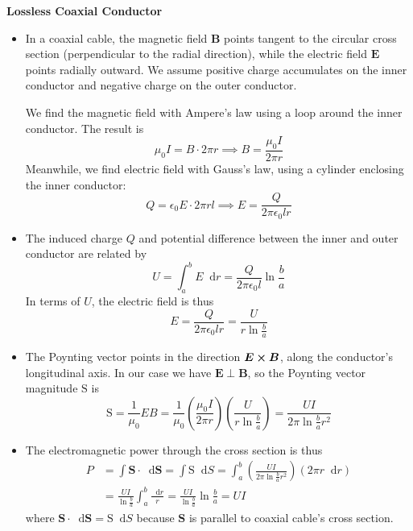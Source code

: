 \documentclass[11pt, a4paper]{article}
\newcommand{\diff}{\mathop{}\!\mathrm{d}} %
\renewcommand{\vec}[1]{\bm{#1}} %
\newcommand{\E}{\vec{E}}  %
\newcommand{\B}{\vec{B}}  %
\renewcommand{\S}{\mathbf{S}}  %
\renewcommand{\SS}{\mathrm{S}}  %
\newcommand{\ee}{\epsilon_{0}}  %
\newcommand{\mm}{\mu_{0}}  %
\newcommand{\m}{\vec{m}}  %
\newcommand{\Poy}{Poynting\xspace}
\begin{document}
\textbf{Lossless Coaxial Conductor}
\begin{itemize}
	\item In a coaxial cable, the magnetic field $ \B $ points tangent to the circular cross section (perpendicular to the radial direction), while the electric field $ \E $ points radially outward. We assume positive charge accumulates on the inner conductor and negative charge on the outer conductor.
	
	We find the magnetic field with Ampere's law using a loop around the inner conductor. The result is
	\begin{equation*}
		\mm I = B \cdot 2\pi r \implies B = \frac{\mm I}{2\pi r}
	\end{equation*}
	Meanwhile, we find electric field with Gauss's law, using a cylinder enclosing the inner conductor:
	\begin{equation*}
		Q = \ee E \cdot 2\pi r l \implies E = \frac{Q}{2\pi \ee l r}
	\end{equation*}
	
	
	\item The induced charge $ Q $ and potential difference between the inner and outer conductor are related by
	\begin{equation*}
		U = \int_{a}^{b} E \diff r = \frac{Q}{2\pi \ee l}\ln \frac{b}{a}
	\end{equation*}
	In terms of $ U $, the electric field is thus
	\begin{equation*}
		E = \frac{Q}{2\pi \ee l r} = \frac{U}{r \ln \frac{b}{a}}
	\end{equation*}
	
	\item The \Poy vector points in the direction $ \E \cross \B $, along the conductor's longitudinal axis. In our case we have $ \E \perp \B $, so the \Poy vector magnitude $ \SS $ is
	\begin{equation*}
		\SS = \frac{1}{\mm}EB = \frac{1}{\mm} \left (\frac{\mm I}{2\pi r}\right )\left(\frac{U}{r \ln \frac{b}{a}}\right) = \frac{UI}{2 \pi \ln \frac{b}{a}r^{2}}
	\end{equation*}
	
	\item The electromagnetic power through the cross section is thus
	\begin{align*}
		P &= \int \S \cdot \diff \vec{S} = \int \SS \diff S = \int_{a}^{b}\left(\frac{UI}{2 \pi \ln \frac{b}{a}r^{2}}\right)(2\pi r \diff r)\\
		& = \frac{UI}{\ln \frac{b}{a}} \int_{a}^{b} \frac{\diff r}{r} =	\frac{UI}{\ln \frac{b}{a}}\ln \frac{b}{a} = UI
	\end{align*}
	where $ \S \cdot \diff \vec{S} = \SS \diff S $ because $ \S $ is parallel to coaxial cable's cross section.
	
\end{itemize}
\end{document}
